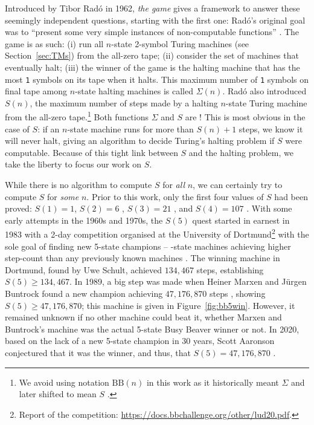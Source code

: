 \documentclass[a4paper,british]{article}
\theoremstyle{definition} %
\numberwithin{equation}{section}
\theoremstyle{definition} %
\newcommand{\sone}{\texttt{1}\xspace}
\newcommand{\BBtheFifth}{47{,}176{,}870}
\newcommand{\radofull}{Tibor Rad\'o\xspace}
\newcommand{\rado}{Rad\'o\xspace}
\begin{document}
Introduced by \radofull in 1962, \textit{the \BBfull game} gives a framework to answer these seemingly independent questions, starting with the first one: \rado's original goal was to ``present some very simple instances of non-computable functions'' \cite{Rado_1962}. The game is as such: (i) run all $n$-state 2-symbol Turing machines (see Section~\ref{sec:TMs}) from the all-zero tape; (ii) consider the set of machines that eventually halt; (iii) the winner of the game is the halting machine that has the most \sone symbols on its tape when it halts. This maximum number of \sone symbols on final tape among $n$-state halting machines is called $\Sigma(n)$. \rado also introduced $S(n)$, the maximum number of steps made by a halting $n$-state Turing machine from the all-zero tape.\footnote{We avoid using notation $\text{BB}(n)$ in this work as it historically meant $\Sigma$ \cite{Rado_1962, 10.5555/1151785.1151794} and later shifted to mean $S$ \cite{BusyBeaverFrontier,sterin_2022_14955828}.} Both functions $\Sigma$ and $S$ are \noncomput! This is most obvious in the case of $S$: if an $n$-state machine runs for more than $S(n)+1$ steps, we know it will never halt, giving an algorithm to decide Turing's halting problem if $S$ were computable. Because of this tight link between $S$ and the halting problem, we take the liberty to focus our work on $S$.

While there is no algorithm to compute $S$ for \textit{all} $n$, we can certainly try to compute $S$ for \textit{some} $n$. Prior to this work, only the first four values of $S$ had been proved: $S(1)=1$, $S(2)=6$ \cite{Rado_1962}, $S(3) = 21$ \cite{Lin1963}, and $S(4) = 107$ \cite{Brady83}. With some early attempts in the 1960s and 1970s, the $S(5)$ quest started in earnest in 1983 with a 2-day competition organised at the University of Dortmund\footnote{Report of the competition: \url{https://docs.bbchallenge.org/other/lud20.pdf}.} with the sole goal of finding new 5-state champions -- -state machines achieving higher step-count than any previously known machines \cite{PMichel_website,michel2019busy}. The winning machine in Dortmund, found by Uwe Schult, achieved $134{,}467$ steps, establishing $S(5) \geq 134{,}467$. In 1989, a big step was made when Heiner Marxen and J\"urgen Buntrock found a new champion achieving $\BBtheFifth$ steps \cite{Marxen_1990}, showing $S(5) \geq \BBtheFifth$; this machine is given in Figure~\ref{fig:bb5win}. However, it remained unknown if no other machine could beat it, \ie whether Marxen and Buntrock's machine was the actual 5-state Busy Beaver winner or not. In 2020, based on the lack of a new 5-state champion in 30 years, Scott Aaronson conjectured that it was the winner, and thus, that $S(5) = \BBtheFifth$ \cite{BusyBeaverFrontier}.
\end{document}
